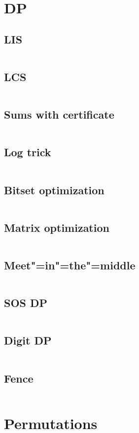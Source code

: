 ﻿\documentclass[10pt,twocolumn,oneside]{article}
\begin{document}
\section{DP}
\subsection{LIS}
\inputminted[breaklines]{cpp}{DP/lis.cpp}
\subsection{LCS}
\inputminted[breaklines]{python}{DP/lcs.py}
\subsection{Sums with certificate}
\inputminted[breaklines]{python}{DP/sums with certificate.py}
\subsection{Log trick}
\inputminted[breaklines]{cpp}{DP/log-trick.cpp}
\subsection{Bitset optimization}
\inputminted[breaklines]{cpp}{DP/bitset optimization.cpp}
\subsection{Matrix optimization}
\inputminted[breaklines]{cpp}{DP/matrix optimization.cpp}
\subsection{Meet"=in"=the"=middle}
\inputminted[breaklines]{cpp}{DP/meet-in-the-middle.cpp}
\subsection{SOS DP}
\inputminted[breaklines]{cpp}{DP/sos-dp.cpp}
\subsection{Digit DP}
\inputminted[breaklines]{cpp}{DP/digit dp.cpp}
\subsection{Fence}
\inputminted[breaklines]{cpp}{DP/fence.cpp}

\section{Permutations}
\end{document}
